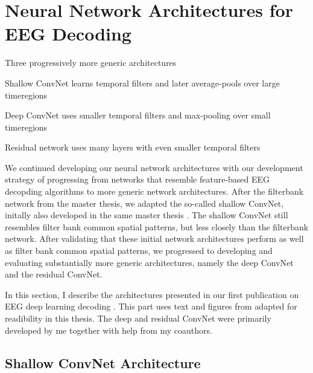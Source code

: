 \chapter{Neural Network Architectures for
EEG Decoding}

\begin{startbox}{Three progressively more generic architectures}
\item Shallow ConvNet learns temporal filters and later average-pools over large timeregions
\item Deep ConvNet uses smaller temporal filters and max-pooling over small timeregions
\item Residual network uses many layers with even smaller temporal filters
\end{startbox}


We continued developing our neural network architectures with our
development strategy of progressing from networks that resemble
feature-based EEG decopding algorithms to more generic network
architectures. After the filterbank network from the master thesis, we
adapted the so-called shallow ConvNet, initally also developed in the
same master thesis \citep{schirrmeister_msc_thesis_2015}.
The shallow ConvNet still resembles filter bank common spatial patterns,
but less closely than the filterbank network. After validating that
these initial network architectures perform as well as filter bank
common spatial patterns, we progressed to developing and evaluating
substantially more generic architectures, namely the deep ConvNet and
the residual ConvNet.

In this section, I describe the architectures presented in our first
publication on EEG deep learning decoding
\citep{schirrmeisterdeephbm2017}. This part uses text and
figures from \citep{schirrmeisterdeephbm2017} adapted for
readibility in this thesis. The deep and residual ConvNet were primarily
developed by me together with help from my coauthors.


    \hypertarget{shallow-convnet-architecture}{%
\section{Shallow ConvNet
Architecture}\label{shallow-convnet-architecture}}

% 

